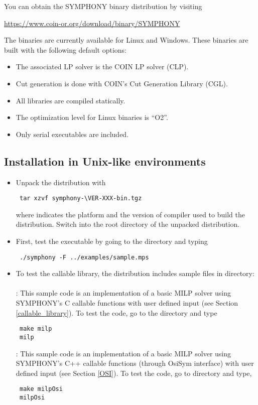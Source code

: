 You can obtain the SYMPHONY binary distribution by visiting 
\begin{center}
 \url{https://www.coin-or.org/download/binary/SYMPHONY}
\end{center}
The binaries are currently available for Linux and Windows. These binaries are
built with the following default options:
\begin{itemize}
\item The associated LP solver is the COIN LP solver (CLP).
\item Cut generation is done with COIN's Cut Generation Library (CGL).
\item All libraries are compiled statically.
\item The optimization level for Linux binaries is ``O2''. 
\item Only serial executables are included.
\end{itemize} 

\subsection{Installation in Unix-like environments}
\label{building-unix}

\begin{itemize}
\item Unpack the distribution with
{\color{Brown}
\begin{verbatim}
 tar xzvf symphony-\VER-XXX-bin.tgz
\end{verbatim}
}
where  indicates the platform and the version of 
compiler used to build the distribution. 
Switch into the root directory of the unpacked distribution. 

\item First, test the executable by going to the  directory and
typing 
{\color{Brown}
\begin{verbatim}
 ./symphony -F ../examples/sample.mps
\end{verbatim}
}
\item To test the callable library, the distribution
includes sample files in  directory:  \\ \\
: This sample code is an implementation of a basic MILP
solver using SYMPHONY's C callable functions with user defined input (see
Section
\ref{callable_library}). To test the code, go to the  directory 
and type 
{\color{Brown}
\begin{verbatim}
 make milp 
 milp
 \end{verbatim}}
: This sample code is an implementation of a basic MILP 
solver using SYMPHONY's C++ callable functions (through OsiSym interface)
with user defined input (see Section \ref{OSI}). To test the code, 
go to  directory and type, 
{\color{Brown}
\begin{verbatim}
 make milpOsi
 milpOsi
 \end{verbatim}}
\end{itemize}

